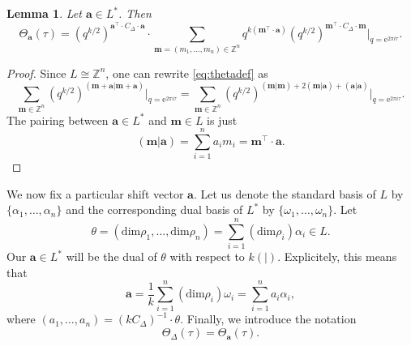 \documentclass[11pt,a4paper]{amsart}
\newtheorem{lemma}[theorem]{Lemma}
\theoremstyle{definition}
\newcommand{\SZ}{\mathbb{Z}}                    %
\begin{document}
\begin{lemma} Let $\mathbf{a} \in L^{\ast}$. Then
\[
\Theta_{\mathbf{a}}(\tau)= (q^{k/2})^{\mathbf{a}^\top \cdot C_\Delta \cdot \mathbf{a}} \cdot \sum_{ \mathbf{m}=(m_1,\dots,m_n) \in \SZ^n } q^{ k(\mathbf{m}^\top \cdot \mathbf{a}) } (q^{k/2})^{\mathbf{m}^\top \cdot C_\Delta \cdot \mathbf{m}} \Big|_{q=\mathrm{e}^{2 \pi i \tau}}.\]
\label{lem:thetadef2}
\end{lemma}
\begin{proof}
Since $L \cong \SZ^n $, one can rewrite \eqref{eq:thetadef}
as
\[ \sum_{\mathbf{m} \in \SZ^n} (q^{k/2})^{(\mathbf{m+\mathbf{a}} | \mathbf{m+\mathbf{a}})} \Big|_{q=\mathrm{e}^{2 \pi i \tau}}=
\sum_{\mathbf{m} \in \SZ^n} (q^{k/2})^{(\mathbf{m}| \mathbf{m})+2(\mathbf{m}|\mathbf{a})+(\mathbf{a}|\mathbf{a})} \Big|_{q=\mathrm{e}^{2 \pi i \tau}}
.\]
The pairing between $\mathbf{a} \in L^{\ast}$ and $\mathbf{m} \in L$ is just \[(\mathbf{m}|\mathbf{a})=\sum_{i=1}^n a_i m_i = \mathbf{m}^\top \cdot \mathbf{a}.\]
\end{proof}







We now fix a particular shift vector $\mathbf{a}$. Let us denote the standard basis of $L$ by $\{\alpha_1, \dots, \alpha_n\}$ and the corresponding dual basis of $L^{\ast}$ by $\{\omega_1, \dots, \omega_n\}$.
Let
\[ \theta=( \mathrm{dim} \rho_1 ,\dots, \mathrm{dim} \rho_n) = \sum_{i=1}^n (\mathrm{dim} \rho_i) \alpha_i \in L.\]
Our $\mathbf{a} \in L^{\ast}$ will be the dual of $\theta$ with respect to $k(|)$. Explicitely, this means that
\begin{equation}\mathbf{a}= \frac{1}{k}\sum_{i=1}^n (\mathrm{dim} \rho_i) \omega_i=\sum_{i=1}^n a_i \alpha_i, 
\label{eq:zetasub}
\end{equation}
where $(a_1,\dots,a_n)=(kC_\Delta)^{-1} \cdot \theta$.
Finally, we introduce the notation
\[ \Theta_{\Delta}(\tau)=\Theta_{\mathbf{a}}(\tau). \]
\end{document}
